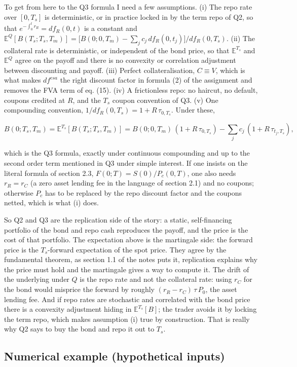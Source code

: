 \documentclass[11pt]{article}
\begin{document}
To get from here to the Q3 formula I need a few assumptions. (i) The repo rate over $[0,T_s]$ is deterministic, or in practice locked in by the term repo of Q2, so that $e^{-\int_0^t r_R} = df_R(0,t)$ is a constant and $\mathbb{E}^{Q}[B(T_s;T_s,T_m)] = \bigl[B(0;0,T_m) - \sum_j c_j\,df_R(0,t_j)\bigr]/df_R(0,T_s)$. (ii) The collateral rate is deterministic, or independent of the bond price, so that $\mathbb{E}^{T_s}$ and $\mathbb{E}^{Q}$ agree on the payoff and there is no convexity or correlation adjustment between discounting and payoff. (iii) Perfect collateralisation, $C \equiv V$, which is what makes $df^{csa}$ the right discount factor in formula (2) of the assignment and removes the FVA term of eq. (15). (iv) A frictionless repo: no haircut, no default, coupons credited at $R$, and the $T_s$ coupon convention of Q3. (v) One compounding convention, $1/df_R(0,T_s) = 1 + R\,\tau_{0,T_s}$. Under these,

\[B(0;T_s,T_m) = \mathbb{E}^{T_s}[B(T_s;T_s,T_m)] = B(0;0,T_m)\,(1 + R\,\tau_{0,T_s}) - \sum_j c_j\,(1 + R\,\tau_{t_j,T_s}),\]

which is the Q3 formula, exactly under continuous compounding and up to the second order term mentioned in Q3 under simple interest. If one insists on the literal formula of section 2.3, $F(0;T) = S(0)/P_c(0,T)$, one also needs $r_R = r_C$ (a zero asset lending fee in the language of section 2.1) and no coupons; otherwise $P_c$ has to be replaced by the repo discount factor and the coupons netted, which is what (i) does.

So Q2 and Q3 are the replication side of the story: a static, self-financing portfolio of the bond and repo cash reproduces the payoff, and the price is the cost of that portfolio. The expectation above is the martingale side: the forward price is the $T_s$-forward expectation of the spot price. They agree by the fundamental theorem, as section 1.1 of the notes puts it, replication explains why the price must hold and the martingale gives a way to compute it. The drift of the underlying under $Q$ is the repo rate and not the collateral rate: using $r_C$ for the bond would misprice the forward by roughly $(r_R - r_C)\,\tau\,P_0$, the asset lending fee. And if repo rates are stochastic and correlated with the bond price there is a convexity adjustment hiding in $\mathbb{E}^{T_s}[B]$; the trader avoids it by locking the term repo, which makes assumption (i) true by construction. That is really why Q2 says to buy the bond and repo it out to $T_s$.

\subsection*{Numerical example (hypothetical inputs)}
\end{document}

